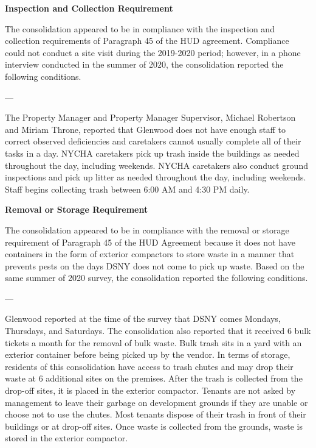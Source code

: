  

\textbf{Inspection and Collection Requirement} 

 

The consolidation appeared to be in compliance with the inspection and collection requirements of Paragraph 45 of the HUD agreement. Compliance could not conduct a site visit during the 2019-2020 period; however, in a phone interview conducted in the summer of 2020, the consolidation reported the following conditions.

 

--- 

The Property Manager and Property Manager Supervisor, Michael Robertson and Miriam Throne, reported that Glenwood does not have enough staff to correct observed deficiencies and caretakers cannot usually complete all of their tasks in a day. NYCHA caretakers pick up trash inside the buildings as needed throughout the day, including weekends. NYCHA caretakers also conduct ground inspections and pick up litter as needed throughout the day, including weekends. Staff begins collecting trash between 6:00 AM and 4:30 PM daily. 

 

\textbf{Removal or Storage Requirement} 

The consolidation appeared to be in compliance with the  removal or storage requirement of Paragraph  45 of the HUD Agreement because it does not have containers in the form of exterior compactors to store waste in a manner that prevents pests on the days DSNY does not come to pick up waste. Based on the same summer of  2020 survey, the consolidation reported the following conditions. 

 

 

--- 

Glenwood reported at the time of the survey that DSNY comes Mondays, Thursdays, and Saturdays. The consolidation also reported that it received 6 bulk tickets a month for the removal of bulk waste. Bulk trash sits in a yard with an exterior container before being picked up by the vendor. In terms of storage, residents of this consolidation have access to trash chutes and may drop their waste at 6 additional sites on the premises. After the trash is collected from the drop-off sites, it is placed in the exterior compactor. Tenants are not asked by management to leave their garbage on development grounds if they are unable or choose not to use the chutes. Most tenants dispose of their trash in front of their buildings or at drop-off sites. Once waste is collected from the grounds, waste is stored in the exterior compactor.

